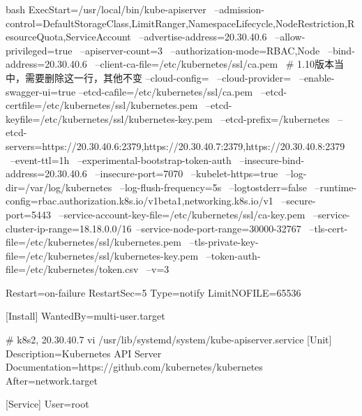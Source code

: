 \begin{outline}[enumerate]
\begin{code-in-enumerate}{bash}
ExecStart=/usr/local/bin/kube-apiserver \
    --admission-control=DefaultStorageClass,LimitRanger,NamespaceLifecycle,NodeRestriction,ResourceQuota,ServiceAccount \
    --advertise-address=20.30.40.6 \
    --allow-privileged=true \
    --apiserver-count=3 \
    --authorization-mode=RBAC,Node \
    --bind-address=20.30.40.6 \
    --client-ca-file=/etc/kubernetes/ssl/ca.pem \ # 1.10版本当中，需要删除这一行，其他不变
    --cloud-config= \
    --cloud-provider= \
    --enable-swagger-ui=true --etcd-cafile=/etc/kubernetes/ssl/ca.pem \
    --etcd-certfile=/etc/kubernetes/ssl/kubernetes.pem \
    --etcd-keyfile=/etc/kubernetes/ssl/kubernetes-key.pem \
    --etcd-prefix=/kubernetes \
    --etcd-servers=https://20.30.40.6:2379,https://20.30.40.7:2379,https://20.30.40.8:2379 \
    --event-ttl=1h \
    --experimental-bootstrap-token-auth \
    --insecure-bind-address=20.30.40.6 \
    --insecure-port=7070 \
    --kubelet-https=true \
    --log-dir=/var/log/kubernetes \
    --log-flush-frequency=5s \
    --logtostderr=false \
    --runtime-config=rbac.authorization.k8s.io/v1beta1,networking.k8s.io/v1 \
    --secure-port=5443 \
    --service-account-key-file=/etc/kubernetes/ssl/ca-key.pem \
    --service-cluster-ip-range=18.18.0.0/16\
    --service-node-port-range=30000-32767 \
    --tls-cert-file=/etc/kubernetes/ssl/kubernetes.pem \
    --tls-private-key-file=/etc/kubernetes/ssl/kubernetes-key.pem \
    --token-auth-file=/etc/kubernetes/token.csv \
    --v=3

Restart=on-failure
RestartSec=5
Type=notify
LimitNOFILE=65536

[Install]
WantedBy=multi-user.target


# k8s2, 20.30.40.7
vi /usr/lib/systemd/system/kube-apiserver.service
[Unit]
Description=Kubernetes API Server
Documentation=https://github.com/kubernetes/kubernetes
After=network.target

[Service]
User=root


\end{code-in-enumerate}
\end{outline}
